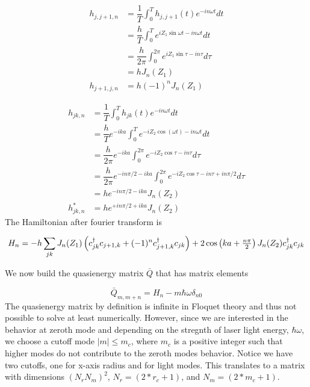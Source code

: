\begin{align}
  h_{j,j+1,n} &= \dfrac{1}{T} \int_0^T h_{j,j+1}(t) e^{-in\omega t} dt \nonumber \\
  &= \dfrac{h}{T} \int_0^T e^{iZ_1 \sin{\omega t} -in\omega t} dt \nonumber \\
  &= \dfrac{h}{2\pi} \int_0^{2\pi} e^{iZ_1 \sin\tau - in\tau} d\tau \nonumber \\
  &= h J_n(Z_1) \\
  h_{j+1,j,n} &= h (-1)^n J_n(Z_1)
\end{align}

\begin{align}
  h_{jk,n} &= \dfrac{1}{T} \int_0^T h_{jk}(t) e^{-in\omega t} dt \nonumber \\
  &= \dfrac{h}{T} e^{-ika} \int_0^T e^{- iZ_2 \cos{(\omega t)} - in\omega t} dt \nonumber \\
  &= \dfrac{h}{2\pi} e^{-ika} \int_0^{2\pi} e^{-i Z_2\cos\tau - in\tau} d\tau \nonumber \\
  &= \dfrac{h}{2\pi} e^{-in\pi/2-ika} \int_0^{2\pi} e^{-iZ_2 \cos\tau - in\tau + in\pi/2} d\tau \nonumber \\
  &= he^{- in\pi/2 -ika} J_{n}(Z_2) \\
  h_{jk,n}^* &= he^{+ in\pi/2 +ika} J_{n}(Z_2)
\end{align}
The Hamiltonian after fourier transform is

\begin{equation}
  H_n = -h \sum_{jk} J_n(Z_1) \left(c^{\dagger}_{jk} c_{j+1,k} + (-1)^n c^{\dagger}_{j+1,k} c_{jk}\right) + 2\cos\left(ka+\tfrac{n\pi}{2}\right) J_n(Z_2) c^{\dagger}_{jk} c_{jk}
\end{equation}

We now build the quasienergy matrix $\bar{Q}$ that has matrix elements

\begin{equation}
  \bar{Q}_{m,m+n} = H_n - m\hbar\omega \delta_{n0}
\end{equation}
The quasienergy matrix by definition is infinite in Floquet theory and thus not possible to solve at least numerically.
However, since we are interested in the behavior at zeroth mode and depending on the stregnth of laser light energy, $\hbar\omega$, we choose a cutoff mode $|m|\leq m_c$, where $m_c$ is a positive integer such that higher modes do not contribute to the zeroth modes behavior.
Notice we have two cutoffs, one for x-axis radius and for light modes.
This translates to a matrix with dimensions ${(N_r N_m)}^2$, $N_r = (2*r_c+1)$, and $N_m=(2*m_c+1)$.

